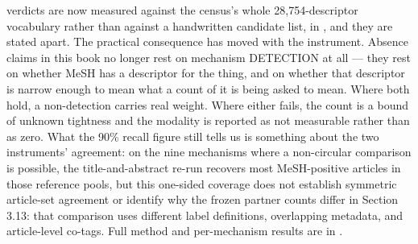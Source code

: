 \documentclass[11pt,twoside,openright]{report}
\begin{document}
verdicts are now measured against the census's whole 28,754-descriptor vocabulary rather than against a handwritten candidate list, in , and they are stated apart. The practical consequence has moved with the instrument. Absence claims in this book no longer rest on mechanism DETECTION at all --- they rest on whether MeSH has a descriptor for the thing, and on whether that descriptor is narrow enough to mean what a count of it is being asked to mean. Where both hold, a non-detection carries real weight. Where either fails, the count is a bound of unknown tightness and the modality is reported as not measurable rather than as zero. What the 90\% recall figure still tells us is something about the two instruments' agreement: on the nine mechanisms where a non-circular comparison is possible, the title-and-abstract re-run recovers most MeSH-positive articles in those reference pools, but this one-sided coverage does not establish symmetric article-set agreement or identify why the frozen partner counts differ in Section 3.13: that comparison uses different label definitions, overlapping metadata, and article-level co-tags. Full method and per-mechanism results are in .
\end{document}
